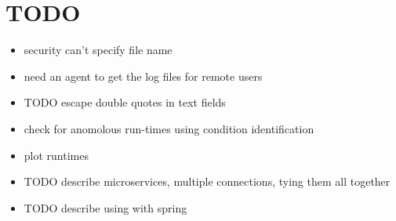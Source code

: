 \documentclass[letterpaper,10pt,english]{sphinxmanual}
\begin{document}
\chapter{TODO}
\label{index:id1}\begin{itemize}
\item {} 
security can't specify file name

\item {} 
need an agent to get the log files for remote users

\item {} 
TODO escape double quotes in text fields

\item {} 
check for anomolous run-times using condition identification

\item {} 
plot runtimes

\item {} 
TODO describe microservices, multiple connections, tying them all
together

\item {} 
TODO describe using with spring

\end{itemize}



\renewcommand{\indexname}{Index}
\printindex
\end{document}
